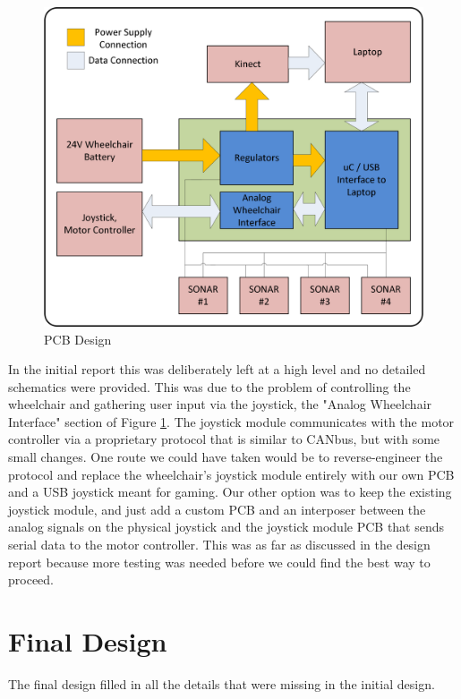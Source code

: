 \documentclass[oneside,final,a4paper]{report}
\begin{document}
\begin{figure}[hbt]
 \centering
 \includegraphics[scale=0.5]{FYDP_PCB_Diagram}
 \caption{PCB Design}\label{fig:hardware_diag}
\end{figure}

In the initial report this was deliberately left at a high level and no detailed schematics were provided. This was due to the problem of controlling the wheelchair and gathering user input via the joystick, the "Analog Wheelchair Interface" section of Figure \ref{fig:hardware_diag}. The joystick module communicates with the motor controller via a proprietary protocol that is similar to CANbus, but with some small changes. One route we could have taken would be to reverse-engineer the protocol and replace the wheelchair's joystick module entirely with our own PCB and a USB joystick meant for gaming. Our other option was to keep the existing joystick module, and just add a custom PCB and an interposer between the analog signals on the physical joystick and the joystick module PCB that sends serial data to the motor controller. This was as far as discussed in the design report because more testing was needed before we could find the best way to proceed.

\section{Final Design}
The final design filled in all the details that were missing in the initial design. 
\end{document}
